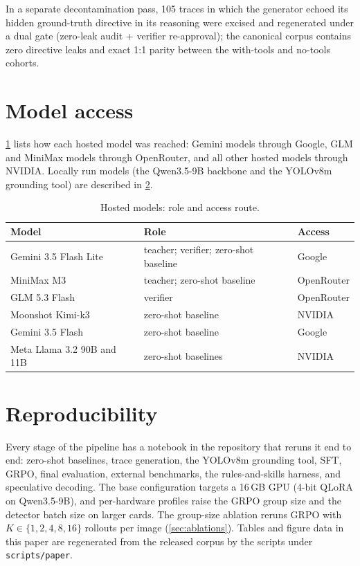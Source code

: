In a separate decontamination pass, 105 traces in which the generator echoed its hidden
ground-truth directive in its reasoning were excised and regenerated under a dual gate (zero-leak
audit + verifier re-approval); the canonical corpus contains zero directive leaks and exact
1:1 parity between the with-tools and no-tools cohorts.

\section{Model access}
\label{app:access}

\cref{tab:access} lists how each hosted model was reached: Gemini models through Google, GLM and MiniMax models through
OpenRouter, and all other hosted models through NVIDIA. Locally run models (the Qwen3.5-9B backbone and the YOLOv8m
grounding tool) are described in \cref{app:repro}.

\begin{table}[htbp]
  \centering
  \small
  \caption{Hosted models: role and access route.}
  \label{tab:access}
  \begin{tabular}{lll}
    \toprule
    Model & Role & Access \\
    \midrule
    Gemini 3.5 Flash Lite & teacher; verifier; zero-shot baseline & Google \\
    MiniMax M3 & teacher; zero-shot baseline & OpenRouter \\
    GLM 5.3 Flash & verifier & OpenRouter \\
    Moonshot Kimi-k3 & zero-shot baseline & NVIDIA \\
    Gemini 3.5 Flash & zero-shot baseline & Google \\
    Meta Llama 3.2 90B and 11B & zero-shot baselines & NVIDIA \\
    \bottomrule
  \end{tabular}
\end{table}

\section{Reproducibility}
\label{app:repro}

Every stage of the pipeline has a notebook in the repository that reruns it end to end: zero-shot baselines, trace
generation, the YOLOv8m grounding tool, SFT, GRPO, final evaluation, external benchmarks, the rules-and-skills harness, and
speculative decoding. The base
configuration targets a 16\,GB GPU (4-bit QLoRA on Qwen3.5-9B), and per-hardware profiles raise the GRPO group size and
the detector batch size on larger cards. The group-size ablation reruns GRPO with $K \in \{1, 2, 4, 8, 16\}$ rollouts per
image (\cref{sec:ablations}). Tables and figure data in this paper are regenerated from the released corpus by the
scripts under \texttt{scripts/paper}.
